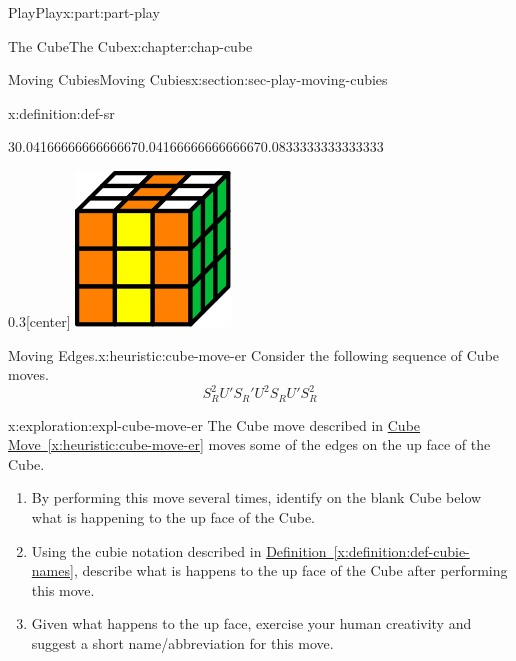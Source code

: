 \documentclass[oneside,10pt,]{book}
\newcommand{\xreffont}{\relax}
\numberwithin{equation}{section}
\begin{document}
\begin{partptx}{Play}{}{Play}{}{}{x:part:part-play}
\begin{chapterptx}{The Cube}{}{The Cube}{}{}{x:chapter:chap-cube}
\begin{sectionptx}{Moving Cubies}{}{Moving Cubies}{}{}{x:section:sec-play-moving-cubies}
\begin{definition}{}{x:definition:def-sr}
\begin{sidebyside}{3}{0.0416666666666667}{0.0416666666666667}{0.0833333333333333}
\begin{sbspanel}{0.3}[center]
\includegraphics[width=\linewidth]{./images/middle_slice.svg}
\end{sbspanel}%
\end{sidebyside}%
\end{definition}
\begin{heuristic}{Moving Edges.}{}{x:heuristic:cube-move-er}%
%
Consider the following sequence of Cube moves.%
%
\begin{equation*}
S_R^2 U' S_R' U^2 S_R U' S_R^2
\end{equation*}
\end{heuristic}
\begin{exploration}{}{x:exploration:expl-cube-move-er}%
The Cube move described in \hyperref[x:heuristic:cube-move-er]{Cube Move~{\xreffont\ref{x:heuristic:cube-move-er}}} moves some of the edges on the up face of the Cube.%
%
\begin{enumerate}
\item{}By performing this move several times, identify on the blank Cube below what is happening to the up face of the Cube.%
\item{}Using the cubie notation described in \hyperref[x:definition:def-cubie-names]{Definition~{\xreffont\ref{x:definition:def-cubie-names}}}, describe what is happens to the up face of the Cube after performing this move.%
\item{}Given what happens to the up face, exercise your human creativity and suggest a short name\slash{}abbreviation for this move.%

\end{enumerate}
\end{exploration}
\end{sectionptx}
\end{chapterptx}
\end{partptx}
\end{document}
